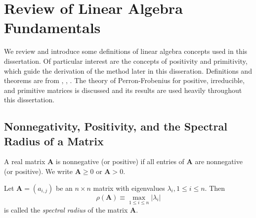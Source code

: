 
\section{Review of Linear Algebra Fundamentals}
\label{sec:LinAlg}

We review and introduce some definitions of linear algebra concepts used in this dissertation. Of particular interest are the concepts of positivity and primitivity, which guide the derivation of the method later in this disseration. Definitions and theorems are from \cite{horn_matrix_2012}, \cite{birkhoff_mathematical_1961}, \cite{varga_matrix_2009}. The theory of Perron-Frobenius for positive, irreducible, and primitive matrices is discussed and its results are used heavily throughout this dissertation.

\subsection{Nonnegativity, Positivity, and the Spectral Radius of a Matrix}

\begin{definition}
A real matrix $\mathbf{A}$ is nonnegative (or positive) if all entries of $\mathbf{A}$ are nonnegative (or positive). We write  $\mathbf{A} \ge 0$ or $\mathbf{A} > 0$.
\end{definition}

\begin{definition}
Let $\mathbf{A} = (a_{i,j})$ be an $n \times n$ matrix with eigenvalues $\lambda_{i}, 1 \le i \le n$. Then
	\begin{equation*}
		\rho(\mathbf{A}) \equiv \max_{1 \le i \le n} |\lambda_{i}|
	\end{equation*}
is called the \textit{spectral radius} of the matrix $\mathbf{A}$.
\end{definition}
		
